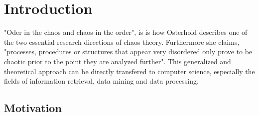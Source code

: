 \chapter{Introduction\label{cha:chapter1}}

"Oder in the chaos and chaos in the order", is is how Osterhold \cite[p. 24f]{osterhold_2013} describes one of the two essential research directions of chaos theory. Furthermore she claims, "processes, procedures or structures that appear very disordered only prove to be chaotic prior to the point they are analyzed further". This generalized and theoretical approach can be directly transfered to computer science, especially the fields of information retrieval, data mining and data processing. 

\section{Motivation\label{sec:moti}}

